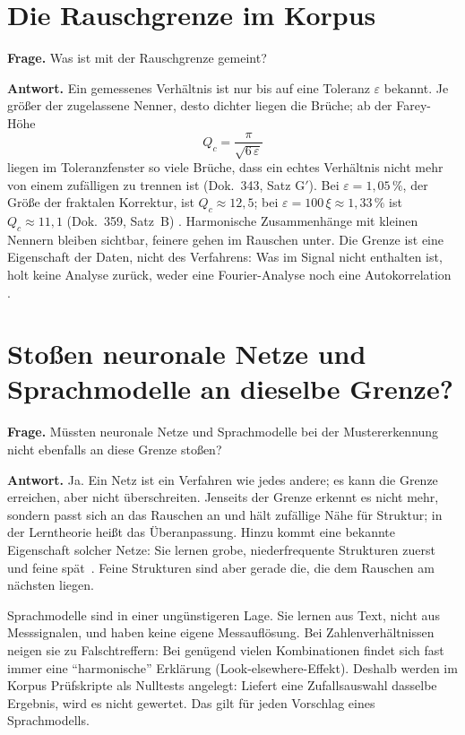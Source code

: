 \section{Die Rauschgrenze im Korpus}

\textbf{Frage.} Was ist mit der Rauschgrenze gemeint?

\textbf{Antwort.} Ein gemessenes Verhältnis ist nur bis auf eine Toleranz $\varepsilon$ bekannt. Je
größer der zugelassene Nenner, desto dichter liegen die Brüche; ab der Farey-Höhe
\[
  Q_c=\frac{\pi}{\sqrt{6\,\varepsilon}}
\]
liegen im Toleranzfenster so viele Brüche, dass ein echtes Verhältnis nicht mehr von einem zufälligen
zu trennen ist (Dok.~343, Satz G$'$). Bei $\varepsilon=1{,}05\,\%$, der Größe der fraktalen Korrektur,
ist $Q_c\approx12{,}5$; bei $\varepsilon=100\,\xi\approx1{,}33\,\%$ ist $Q_c\approx11{,}1$ (Dok.~359,
Satz~B) \KM. Harmonische Zusammenhänge mit kleinen Nennern bleiben sichtbar, feinere gehen im Rauschen
unter. Die Grenze ist eine Eigenschaft der Daten, nicht des Verfahrens: Was im Signal nicht enthalten
ist, holt keine Analyse zurück, weder eine Fourier-Analyse noch eine Autokorrelation \BM.

\section{Stoßen neuronale Netze und Sprachmodelle an dieselbe Grenze?}

\textbf{Frage.} Müssten neuronale Netze und Sprachmodelle bei der Mustererkennung nicht ebenfalls an
diese Grenze stoßen?

\textbf{Antwort.} Ja. Ein Netz ist ein Verfahren wie jedes andere; es kann die Grenze erreichen, aber
nicht überschreiten. Jenseits der Grenze erkennt es nicht mehr, sondern passt sich an das Rauschen an
und hält zufällige Nähe für Struktur; in der Lerntheorie heißt das Überanpassung. Hinzu kommt eine
bekannte Eigenschaft solcher Netze: Sie lernen grobe, niederfrequente Strukturen zuerst und feine
spät \QM\,\cite{Rahaman2019}. Feine Strukturen sind aber gerade die, die dem Rauschen am nächsten
liegen.

Sprachmodelle sind in einer ungünstigeren Lage. Sie lernen aus Text, nicht aus Messsignalen, und haben
keine eigene Messauflösung. Bei Zahlenverhältnissen neigen sie zu Falschtreffern: Bei genügend vielen
Kombinationen findet sich fast immer eine \enquote{harmonische} Erklärung (Look-elsewhere-Effekt).
Deshalb werden im Korpus Prüfskripte als Nulltests angelegt: Liefert eine Zufallsauswahl dasselbe
Ergebnis, wird es nicht gewertet. Das gilt für jeden Vorschlag eines Sprachmodells.

